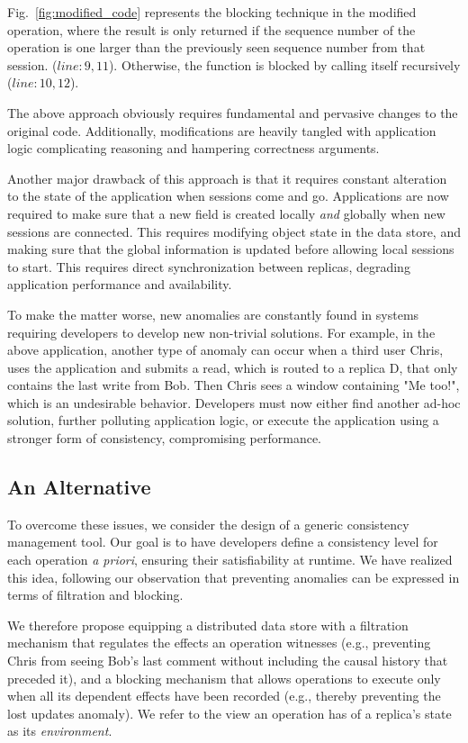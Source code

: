 Fig.~\ref{fig:modified_code} represents the blocking technique in the
modified \readC{} operation, where the result is only returned if the
sequence number of the operation is one larger than the previously
seen sequence number from that session.  ($line:9,11$). Otherwise, the
function is blocked by calling itself recursively ($line:10,12$).


The above approach obviously requires fundamental and pervasive
changes to the original code.  Additionally, modifications are heavily
tangled with application logic complicating reasoning and hampering
correctness arguments.

Another major drawback of this approach is that it requires constant
alteration to the state of the application when sessions come and go.
Applications are now required to make sure that a new field is created
locally \emph{and} globally when new sessions are connected. This
requires modifying object state in the data store, and making sure
that the global information is updated before allowing local sessions
to start. This requires direct synchronization between replicas,
degrading application performance and availability.

To make the matter worse, new anomalies are constantly found in
systems requiring developers to develop new non-trivial solutions. For
example, in the above application, another type of anomaly can occur
when a third user Chris, uses the application and submits a read,
which is routed to a replica D, that only contains the last write from
Bob. Then Chris sees a window containing "Me too!", which is an
undesirable behavior.  Developers must now either find another ad-hoc
solution, further polluting application logic, or execute the
application using a stronger form of consistency, compromising
performance.

%
%
\subsection{An Alternative}
%
To overcome these issues, we consider the design of a generic
consistency management tool.  Our goal is to have developers define a
consistency level for each operation \emph{a priori}, ensuring their
satisfiability at runtime. We have realized this idea, following our
observation that preventing anomalies can be expressed in terms of
filtration and blocking.

We therefore propose equipping a distributed data store with a
filtration mechanism that regulates the effects an operation witnesses
(e.g., preventing Chris from seeing Bob's last comment without
including the causal history that preceded it), and a blocking
mechanism that allows operations to execute only when all its
dependent effects have been recorded (e.g., thereby preventing the
lost updates anomaly).  We refer to the view an operation has of a
replica's state as its \emph{environment}.

